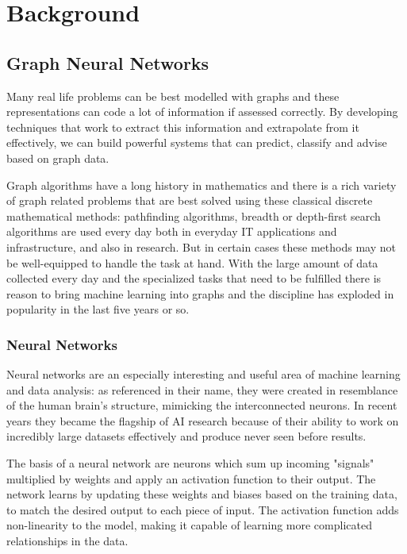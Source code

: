\chapter{Background}

\section{Graph Neural Networks}

	Many real life problems can be best modelled with graphs and these representations can code a lot of information if assessed correctly. By developing techniques that work to extract this information and extrapolate from it effectively, we can build powerful systems that can predict, classify and advise based on graph data.
	
	Graph algorithms have a long history in mathematics and there is a rich variety of graph related problems that are best solved using these classical discrete mathematical methods: pathfinding algorithms, breadth or depth-first search algorithms are used every day both in everyday IT applications and infrastructure, and also in research. But in certain cases these methods may not be well-equipped to handle the task at hand. With the large amount of data collected every day and the specialized tasks that need to be fulfilled there is reason to bring machine learning into graphs and the discipline has exploded in popularity in the last five years or so.

	\subsection{Neural Networks}
	
	Neural networks are an especially interesting and useful area of machine learning and data analysis: as referenced in their name, they were created in resemblance of the human brain's structure, mimicking the interconnected neurons. In recent years they became the flagship of AI research because of their ability to work on incredibly large datasets effectively and produce never seen before results. 
	
	The basis of a neural network are neurons which sum up incoming "signals" multiplied by weights and apply an activation function to their output. The network learns by updating these weights and biases based on the training data, to match the desired output to each piece of input. The activation function adds non-linearity to the model, making it capable of learning more complicated relationships in the data.
	
